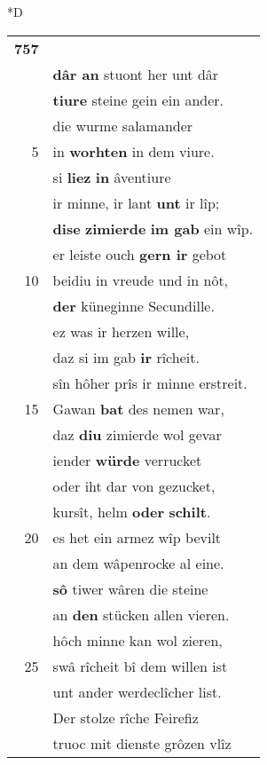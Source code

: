 \documentclass[8pt,a4paper,notitlepage]{article}
\begin{document}
\begin{table}[ht]
\begin{minipage}[t]{0.5\linewidth}
\small
\begin{center}*D
\end{center}
\begin{tabular}{rl}
\textbf{757} & \textbf{\begin{large}R\end{large}ûch} gebildet, snêvar.\\ 
 & \textbf{dâr an} stuont her unt dâr\\ 
 & \textbf{tiure} steine gein ein ander.\\ 
 & die wurme salamander\\ 
5 & in \textbf{worhten} in dem viure.\\ 
 & si \textbf{liez} \textbf{in} âventiure\\ 
 & ir minne, ir lant \textbf{unt} ir lîp;\\ 
 & \textbf{dise} \textbf{zimierde} \textbf{im gab} ein wîp.\\ 
 & er leiste ouch \textbf{gern ir} gebot\\ 
10 & beidiu in vreude und in nôt,\\ 
 & \textbf{der} küneginne Secundille.\\ 
 & ez was ir herzen wille,\\ 
 & daz si im gab \textbf{ir} rîcheit.\\ 
 & sîn hôher prîs ir minne erstreit.\\ 
15 & Gawan \textbf{bat} des nemen war,\\ 
 & daz \textbf{diu} zimierde wol gevar\\ 
 & iender \textbf{würde} verrucket\\ 
 & oder iht dar von gezucket,\\ 
 & kursît, helm \textbf{oder} \textbf{schilt}.\\ 
20 & es het ein armez wîp bevilt\\ 
 & an dem wâpenrocke al eine.\\ 
 & \textbf{sô} tiwer wâren die steine\\ 
 & an \textbf{den} stücken allen vieren.\\ 
 & hôch minne kan wol zieren,\\ 
25 & swâ rîcheit bî dem willen ist\\ 
 & unt ander werdeclîcher list.\\ 
 & Der stolze rîche Feirefiz\\ 
 & truoc mit dienste grôzen vlîz\\ 

\end{tabular}
\end{minipage}
\end{table}
\end{document}
